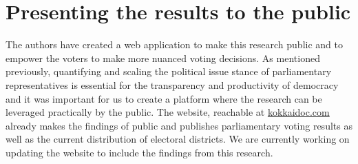 \documentclass[final,5p,times,twocolumn,authoryear]{elsarticle}
\begin{document}
	

\FloatBarrier



\section{Presenting the results to the public}
\label{section: kokkaidoc}
The authors have created a web application to make this research public and to empower the voters to make more nuanced voting decisions. As mentioned previously, quantifying and scaling the political issue stance of parliamentary representatives is essential for the transparency and productivity of democracy and it was important for us to create a platform where the research can be leveraged practically by the public. The website, reachable at \url{kokkaidoc.com} already makes the findings of \citeauthor{kato2024lupinllmbasedpoliticalideology} public and publishes parliamentary voting results as well as the current distribution of electoral districts. We are currently working on updating the website to include the findings from this research.
\end{document}
